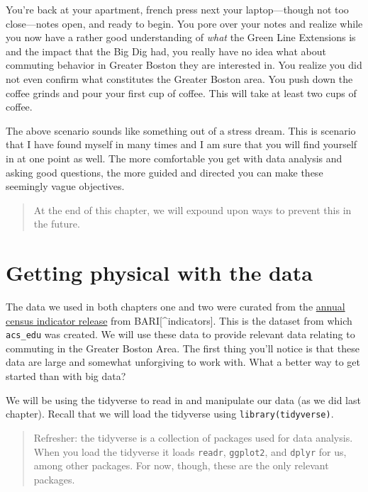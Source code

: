 \documentclass[
]{book}
\begin{document}
You're back at your apartment, french press next your laptop---though not too close---notes open, and ready to begin. You pore over your notes and realize while you now have a rather good understanding of \emph{what} the Green Line Extensions is and the impact that the Big Dig had, you really have no idea what about commuting behavior in Greater Boston they are interested in. You realize you did not even confirm what constitutes the Greater Boston area. You push down the coffee grinds and pour your first cup of coffee. This will take at least two cups of coffee.

The above scenario sounds like something out of a stress dream. This is scenario that I have found myself in many times and I am sure that you will find yourself in at one point as well. The more comfortable you get with data analysis and asking good questions, the more guided and directed you can make these seemingly vague objectives.

\begin{quote}
At the end of this chapter, we will expound upon ways to prevent this in the future.
\end{quote}

\hypertarget{getting-physical-with-the-data}{%
\section{Getting physical with the data}\label{getting-physical-with-the-data}}

The data we used in both chapters one and two were curated from the \href{https://dataverse.harvard.edu/dataset.xhtml?persistentId=doi:10.7910/DVN/XZXAUP}{annual census indicator release} from BARI{[}\^{}indicators{]}. This is the dataset from which \texttt{acs\_edu} was created. We will use these data to provide relevant data relating to commuting in the Greater Boston Area. The first thing you'll notice is that these data are large and somewhat unforgiving to work with. What a better way to get started than with big data?

We will be using the tidyverse to read in and manipulate our data (as we did last chapter). Recall that we will load the tidyverse using \texttt{library(tidyverse)}.

\begin{quote}
Refresher: the tidyverse is a collection of packages used for data analysis. When you load the tidyverse it loads \texttt{readr}, \texttt{ggplot2}, and \texttt{dplyr} for us, among other packages. For now, though, these are the only relevant packages.
\end{quote}
\end{document}
